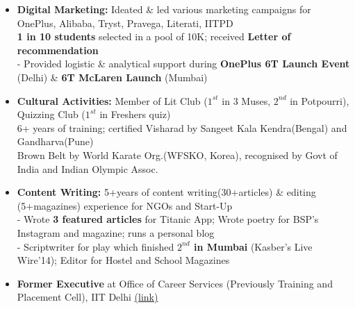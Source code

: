 \documentclass{article}
\begin{document}
\begin{itemize}
    \item \textbf{Digital Marketing:} Ideated \& led various marketing campaigns for OnePlus, Alibaba, Tryst, Pravega, Literati, IITPD\\
    \underline{} \textbf{1 in 10 students} selected in a pool of 10K; received \textbf{Letter of recommendation}\\
    - Provided logistic \& analytical support during \textbf{OnePlus 6T Launch Event} (Delhi) \& \textbf{6T McLaren Launch} (Mumbai)
    
    \item \textbf{Cultural Activities:} \underline{} Member of Lit Club ($1^{st}$ in 3 Muses, $2^{nd}$ in Potpourri), Quizzing Club ($1^{st}$ in Freshers quiz)\\
\underline{} 6+ years of training; certified Visharad by Sangeet Kala Kendra(Bengal) and Gandharva(Pune)\\
\underline{} Brown Belt by World Karate Org.(WFSKO, Korea), recognised by Govt of India and Indian Olympic Assoc.

\item \textbf{Content Writing:} 5+years of content writing(30+articles) \& editing (5+magazines) experience for NGOs and Start-Up\\
- Wrote \textbf{3 featured articles} for Titanic App; Wrote poetry for BSP's Instagram and magazine; runs a personal blog\\
- Scriptwriter for play which finished \textbf{$2^{nd}$ in Mumbai} (Kasber's Live Wire'14); Editor for Hostel and School Magazines
    
    \item \textbf{Former Executive} at Office of Career Services (Previously Training and Placement Cell), IIT Delhi \href{https://tnp.iitd.ac.in/newtnp/}{(link)}
     
\end{itemize}





\end{document}
